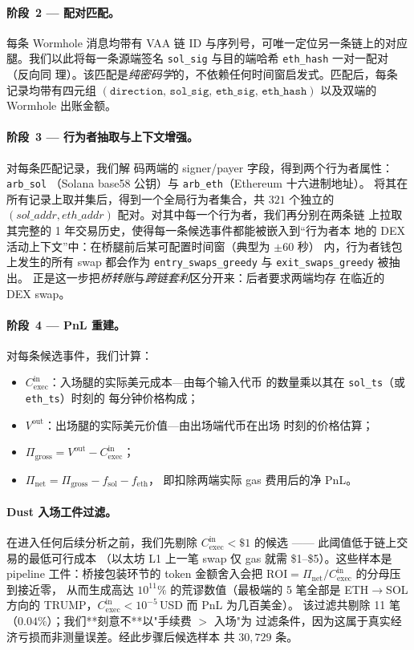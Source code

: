 \documentclass[sigconf,nonacm,10pt]{acmart}
\newcommand{\EthSol}{ETH$\to$SOL}
\newcommand{\Cexec}{C_{\text{exec}}}
\begin{document}
\paragraph{阶段~2 --- 配对匹配。} 每条 Wormhole 消息均带有 VAA 链 ID
与序列号，可唯一定位另一条链上的对应腿。我们以此将每一条源端签名
\texttt{sol\_sig} 与目的端哈希 \texttt{eth\_hash} 一对一配对（反向同
理）。该匹配是\emph{纯密码学}的，不依赖任何时间窗启发式。匹配后，每条
记录均带有四元组
$(\texttt{direction, sol\_sig, eth\_sig, eth\_hash})$ 以及双端的
Wormhole 出账金额。

\paragraph{阶段~3 --- 行为者抽取与上下文增强。} 对每条匹配记录，我们解
码两端的 signer/payer 字段，得到两个行为者属性：\texttt{arb\_sol}
（Solana base58 公钥）与 \texttt{arb\_eth}（Ethereum 十六进制地址）。
将其在所有记录上取并集后，得到一个全局行为者集合，共 $321$ 个独立的
$(sol\_addr, eth\_addr)$ 配对。对其中每一个行为者，我们再分别在两条链
上拉取其完整的 1 年交易历史，使得每一条候选事件都能被嵌入到“行为者本
地的 DEX 活动上下文”中：在桥腿前后某可配置时间窗（典型为 $\pm 60$ 秒）
内，行为者钱包上发生的所有 swap 都会作为
\texttt{entry\_swaps\_greedy} 与 \texttt{exit\_swaps\_greedy} 被抽出。
正是这一步把\emph{桥转账}与\emph{跨链套利}区分开来：后者要求两端均存
在临近的 DEX swap。

\paragraph{阶段~4 --- PnL 重建。} 对每条候选事件，我们计算：
\begin{itemize}
    \item $\Cexec^{\text{in}}$：入场腿的实际美元成本---由每个输入代币
        的数量乘以其在 \texttt{sol\_ts}（或 \texttt{eth\_ts}）时刻的
        每分钟价格构成；
    \item $V^{\text{out}}$：出场腿的实际美元价值---由出场端代币在出场
        时刻的价格估算；
    \item $\Pi_{\text{gross}} = V^{\text{out}} - \Cexec^{\text{in}}$；
    \item $\Pi_{\text{net}} = \Pi_{\text{gross}} - f_{\text{sol}} - f_{\text{eth}}$，
        即扣除两端实际 gas 费用后的净 PnL。
\end{itemize}
\paragraph{Dust 入场工件过滤。} 在进入任何后续分析之前，我们先剔除
$\Cexec^{\text{in}}<\$1$ 的候选 —— 此阈值低于链上交易的最低可行成本
（以太坊 L1 上一笔 swap 仅 gas 就需 \$1--\$5）。这些样本是 pipeline
工件：桥接包装环节的 token 金额舍入会把
$\mathrm{ROI}=\Pi_{\text{net}}/\Cexec^{\text{in}}$ 的分母压到接近零，
从而生成高达 $10^{11}\%$ 的荒谬数值（最极端的 5 笔全部是 \EthSol{}
方向的 TRUMP，$\Cexec^{\text{in}}<\!10^{-5}$\,USD 而 PnL 为几百美金）。
该过滤共剔除 11 笔（$0.04\%$）；我们**刻意不**以"手续费 $>$ 入场"为
过滤条件，因为这属于真实经济亏损而非测量误差。经此步骤后候选样本
共 $30{,}729$ 条。
\end{document}
